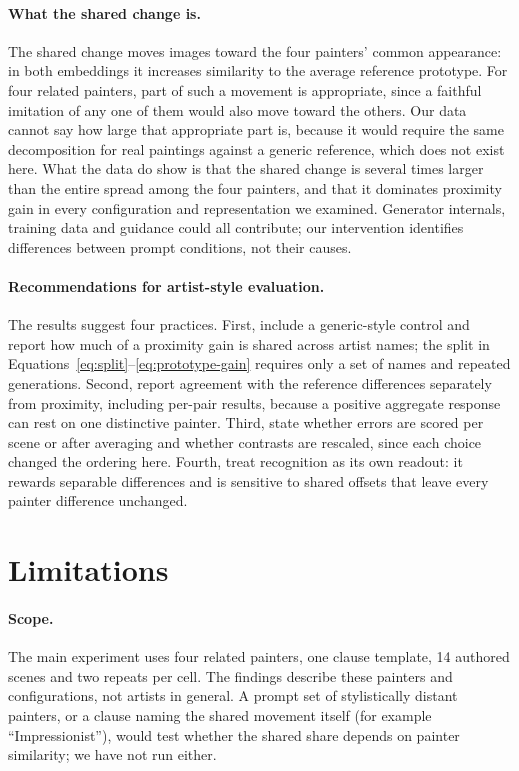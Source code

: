 \documentclass[10pt]{article}
\begin{document}
\paragraph{What the shared change is.}
The shared change moves images toward the four painters' common appearance: in both
embeddings it increases similarity to the average reference prototype. For four
related painters, part of such a movement is appropriate, since a faithful imitation
of any one of them would also move toward the others. Our data cannot say how large
that appropriate part is, because it would require the same decomposition for real
paintings against a generic reference, which does not exist here. What the data do
show is that the shared change is several times larger than the entire spread among
the four painters, and that it dominates proximity gain in every configuration and
representation we examined. Generator internals, training data and guidance could
all contribute; our intervention identifies differences between prompt conditions,
not their causes.

\paragraph{Recommendations for artist-style evaluation.}
The results suggest four practices. First, include a generic-style control and
report how much of a proximity gain is shared across artist names; the split in
Equations~\ref{eq:split}--\ref{eq:prototype-gain} requires only a set of names and
repeated generations. Second, report agreement with the reference differences
separately from proximity, including per-pair results, because a positive aggregate
response can rest on one distinctive painter. Third, state whether errors are scored
per scene or after averaging and whether contrasts are rescaled, since each choice
changed the ordering here. Fourth, treat recognition as its own readout: it rewards
separable differences and is sensitive to shared offsets that leave every painter
difference unchanged.

\section{Limitations}\label{sec:limitations}

\paragraph{Scope.} The main experiment uses four related painters, one clause
template, 14 authored scenes and two repeats per cell. The findings describe these
painters and configurations, not artists in general. A prompt set of stylistically
distant painters, or a clause naming the shared movement itself (for example
``Impressionist''), would test whether the shared share depends on painter
similarity; we have not run either.
\end{document}
